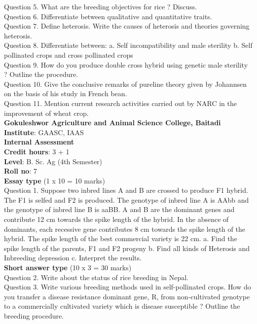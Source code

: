 \documentclass[12pt]{article}\usepackage[]{graphicx}\usepackage[]{color}
\begin{document}
Question 5. What are the breeding objectives for rice ? Discuss.\\
Question 6. Differentiate between qualitative and quantitative traits.\\
Question 7. Define heterosis. Write the causes of heterosis and theories governing heterosis.\\
Question 8. Differentiate between: a. Self incompatibility and male sterility b. Self pollinated crops and cross pollinated crops\\
Question 9. How do you produce double cross hybrid using genetic male sterility ? Outline the procedure.\\
Question 10. Give the conclusive remarks of pureline theory given by Johannsen on the basis of his study in French bean.\\
Question 11. Mention current research activities carried out by NARC in the improvement of wheat crop.\\
\clearpage 
{\centering \Large{\textbf{Gokuleshwor Agriculture and Animal Science College, Baitadi}} \\[0.25cm]
            \textbf{Institute}: GAASC, IAAS \\[0.2cm]
            \textbf{Internal Assessment} \\[0.2cm]} 
\textbf{Credit hours}: 3 + 1 \\ 
\textbf{Level}: B. Sc. Ag (4th Semester) \\
\textbf{Roll no}: 7 \\[0.5cm] 
\textbf{Essay type} (1 x 10 = 10 marks) \\
Question 1. Suppose two inbred lines A and B are crossed to produce F1 hybrid. The F1 is selfed and F2 is produced. The genotype of inbred line A is AAbb and the genotype of inbred line B is aaBB. A and B are the dominant genes and contribute 12 cm towards the spike length of the hybrid. In the absence of dominants, each recessive gene contributes 8 cm towards the spike length of the hybrid. The spike length of the best commercial variety is 22 cm. a. Find the spike length of the parents, F1 and F2 progeny b. Find all kinds of Heterosis and Inbreeding depression c. Interpret the results.\\
\textbf{Short answer type} (10 x 3 = 30 marks) \\
Question 2. Write about the status of rice breeding in Nepal.\\
Question 3. Write various breeding methods used in self-pollinated crops. How do you transfer a disease resistance dominant gene, R, from non-cultivated genotype to a commercially cultivated variety which is disease susceptible ? Outline the breeding procedure.\\
\end{document}
